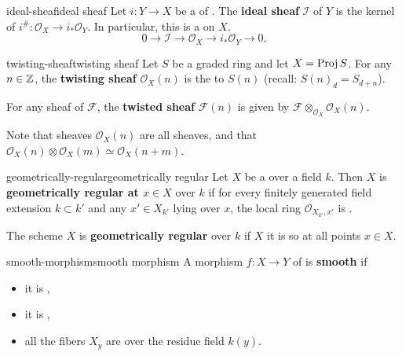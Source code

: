 \begin{topic}{ideal-sheaf}{ideal sheaf}
    Let $i : Y \to X$ be a  of . The \textbf{ideal sheaf} $\mathcal{I}$ of $Y$ is the kernel of $i^\# : \mathcal{O}_X \to i_* \mathcal{O}_Y$. In particular, this is a  on $X$.
    \[ 0 \to \mathcal{I} \to \mathcal{O}_X \to i_* \mathcal{O}_Y \to 0 . \]
\end{topic}

\begin{topic}{twisting-sheaf}{twisting sheaf}
    Let $S$ be a graded ring and let $X = \operatorname{Proj} S$. For any $n \in \mathbb{Z}$, the \textbf{twisting sheaf} $\mathcal{O}_X(n)$ is the  to $S(n)$ (recall: $S(n)_d = S_{d + n}$).
    
    For any sheaf of  $\mathcal{F}$, the \textbf{twisted sheaf} $\mathcal{F}(n)$ is given by $\mathcal{F} \otimes_{\mathcal{O}_X} \mathcal{O}_X(n)$.
    
    Note that sheaves $\mathcal{O}_X(n)$ are all  sheaves, and that $\mathcal{O}_X(n) \otimes \mathcal{O}_X(m) \simeq \mathcal{O}_X(n + m)$.
\end{topic}

\begin{topic}{geometrically-regular}{geometrically regular}
    Let $X$ be a   over a field $k$. Then $X$ is \textbf{geometrically regular at $x \in X$} over $k$ if for every finitely generated field extension $k \subset k'$ and any $x' \in X_{k'}$ lying over $x$, the local ring $\mathcal{O}_{X_{k'}, x'}$ is .
    
    The scheme $X$ is \textbf{geometrically regular} over $k$ if $X$ it is so at all points $x \in X$.
\end{topic}

\begin{topic}{smooth-morphism}{smooth morphism}
    A morphism $f : X \to Y$ of  is \textbf{smooth} if
    \begin{itemize}
        \item it is ,
        \item it is ,
        \item all the fibers $X_y$ are  over the residue field $k(y)$.
    \end{itemize}
\end{topic}

